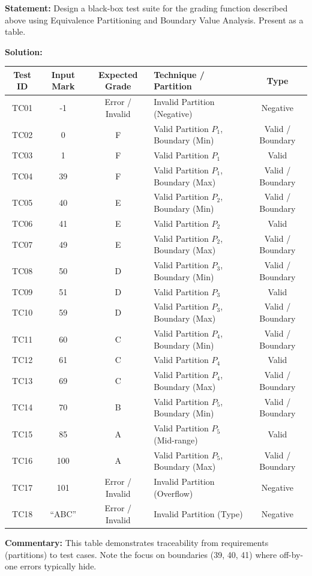 \documentclass[11pt]{article}
\begin{document}
\begin{exoresolu}
\textbf{Statement:} Design a black-box test suite for the grading function described above using Equivalence Partitioning and Boundary Value Analysis. Present as a table.

\textbf{Solution:}
\begin{center}
\begin{tabularx}{\linewidth}{|c|c|c|X|c|}
\hline
\rowcolor{popblueL}
\textbf{Test ID} & \textbf{Input Mark} & \textbf{Expected Grade} & \textbf{Technique / Partition} & \textbf{Type} \\
\hline
TC01 & -1 & Error / Invalid & Invalid Partition (Negative) & Negative \\
TC02 & 0 & F & Valid Partition $P_1$, Boundary (Min) & Valid / Boundary \\
TC03 & 1 & F & Valid Partition $P_1$ & Valid \\
TC04 & 39 & F & Valid Partition $P_1$, Boundary (Max) & Valid / Boundary \\
TC05 & 40 & E & Valid Partition $P_2$, Boundary (Min) & Valid / Boundary \\
TC06 & 41 & E & Valid Partition $P_2$ & Valid \\
TC07 & 49 & E & Valid Partition $P_2$, Boundary (Max) & Valid / Boundary \\
TC08 & 50 & D & Valid Partition $P_3$, Boundary (Min) & Valid / Boundary \\
TC09 & 51 & D & Valid Partition $P_3$ & Valid \\
TC10 & 59 & D & Valid Partition $P_3$, Boundary (Max) & Valid / Boundary \\
TC11 & 60 & C & Valid Partition $P_4$, Boundary (Min) & Valid / Boundary \\
TC12 & 61 & C & Valid Partition $P_4$ & Valid \\
TC13 & 69 & C & Valid Partition $P_4$, Boundary (Max) & Valid / Boundary \\
TC14 & 70 & B & Valid Partition $P_5$, Boundary (Min) & Valid / Boundary \\
TC15 & 85 & A & Valid Partition $P_5$ (Mid-range) & Valid \\
TC16 & 100 & A & Valid Partition $P_5$, Boundary (Max) & Valid / Boundary \\
TC17 & 101 & Error / Invalid & Invalid Partition (Overflow) & Negative \\
TC18 & ``ABC'' & Error / Invalid & Invalid Partition (Type) & Negative \\
\hline
\end{tabularx}
\end{center}
\textbf{Commentary:} This table demonstrates traceability from requirements (partitions) to test cases. Note the focus on boundaries (39, 40, 41) where off-by-one errors typically hide.
\end{exoresolu}
\end{document}
